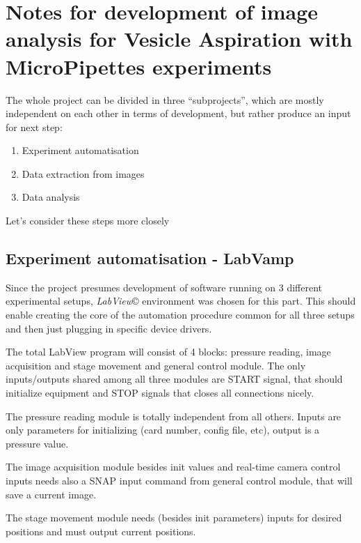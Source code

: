 
\chapter{Notes for development of image analysis for Vesicle Aspiration with MicroPipettes experiments}

The whole project can be divided in three ``subprojects'', which are mostly independent on each other in terms of development, but rather produce an input for next step:
\begin{enumerate}
	\item Experiment automatisation
	\item Data extraction from images
	\item Data analysis
\end{enumerate}
Let's consider these steps more closely

\section{Experiment automatisation - LabVamp}\label{experiment}

Since the project presumes development of software running on 3 different experimental setups, \emph{LabView}\copyright{} environment was chosen for this part. This should enable creating the core of the automation procedure common for all three setups and then just plugging in specific device drivers.

The total LabView program will consist of 4 blocks: pressure reading, image acquisition and stage movement and general control module. The only inputs/outputs shared among all three modules are START signal, that should initialize equipment and STOP signals that closes all connections nicely.

The pressure reading module is totally independent from all others. Inputs are only parameters for initializing (card number, config file, etc), output is a pressure value.

The image acquisition module besides init values and real-time camera control inputs needs also a SNAP input command from general control module, that will save a current image.

The stage movement module needs (besides init parameters) inputs for desired positions and must output current positions.

